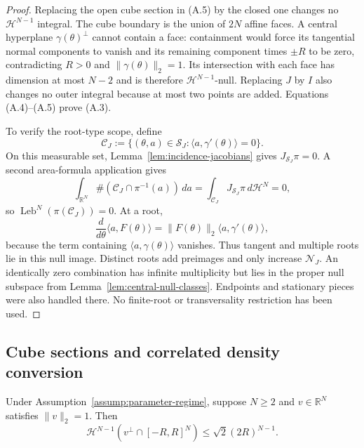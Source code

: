 \begin{proof}
Replacing the open cube section in (A.5) by the closed one changes no
$\mathcal H^{N-1}$ integral.  The cube boundary is the union of $2N$ affine
faces.  A central hyperplane $\gamma(\theta)^\perp$ cannot contain a face:
containment would force its tangential normal components to vanish and its
remaining component times $\pm R$ to be zero, contradicting $R>0$ and
$\|\gamma(\theta)\|_2=1$.  Its intersection with each face has dimension at
most $N-2$ and is therefore $\mathcal H^{N-1}$-null.  Replacing $J$ by $I$
also changes no outer integral because at most two points are added.  Equations
(A.4)--(A.5) prove (A.3).

To verify the root-type scope, define
\[
\mathcal C_J:=\{(\theta,a)\in\mathcal S_J:
 \langle a,\gamma'(\theta)\rangle=0\}.
\]
On this measurable set, Lemma~\ref{lem:incidence-jacobians} gives
$J_{\mathcal S_J}\pi=0$.  A second area-formula application gives
\[
\int_{\mathbb R^N}
 \#(\mathcal C_J\cap\pi^{-1}(a))\,da
=\int_{\mathcal C_J}J_{\mathcal S_J}\pi\,d\mathcal H^N=0,
\]
so $\operatorname{Leb}^N(\pi(\mathcal C_J))=0$.  At a root,
\[
\frac d{d\theta}\langle a,F(\theta)\rangle
=\|F(\theta)\|_2\langle a,\gamma'(\theta)\rangle,
\]
because the term containing $\langle a,\gamma(\theta)\rangle$ vanishes.
Thus tangent and multiple roots lie in this null image.  Distinct roots add
preimages and only increase $\mathcal N_J$.  An identically zero combination
has infinite multiplicity but lies in the proper null subspace from
Lemma~\ref{lem:central-null-classes}.  Endpoints and stationary pieces were
also handled there.  No finite-root or transversality restriction has been
used.
\end{proof}

\subsection{Cube sections and correlated density conversion}
\label{app:cube-density}

\begin{lemma}
\label{lem:scaled-cube-section}
Under Assumption~\ref{assump:parameter-regime}, suppose $N\geq2$ and
$v\in\mathbb R^N$ satisfies $\|v\|_2=1$.  Then
\[
\mathcal H^{N-1}(v^\perp\cap[-R,R]^N)
\leq\sqrt2(2R)^{N-1}.
\tag{A.6}
\]
\end{lemma}


